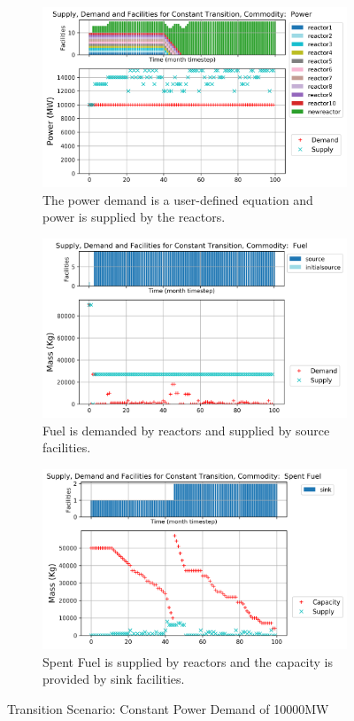 \documentclass[11pt]{article}
\begin{document}
\begin{figure}[!htbp]
    \centering
    \begin{subfigure}[t]{\textwidth}
    \centering
        \includegraphics[width=0.8\linewidth]{figures/constanttransition-power.png} 
        \caption{The power demand is a user-defined equation and power is supplied by the reactors.}
        \label{fig:constanttransition-power}
    \end{subfigure}
    \begin{subfigure}[t]{\textwidth}
        \centering
        \includegraphics[width=0.8\linewidth]{figures/constanttransition-fuel.png} 
        \caption{Fuel is demanded by reactors and supplied by source facilities.}
	    \label{fig:constanttransition-fuel}
    \end{subfigure}
    \begin{subfigure}[t]{\textwidth}
        \centering
        \includegraphics[width=0.8\linewidth]{figures/constanttransition-spentfuel.png} 
        \caption{Spent Fuel is supplied by reactors and the capacity is provided by sink facilities.}
        \label{fig:constanttransition-spentfuel}
    \end{subfigure}
    \caption{Transition Scenario: Constant Power Demand of 10000MW}
\end{figure}
\end{document}
